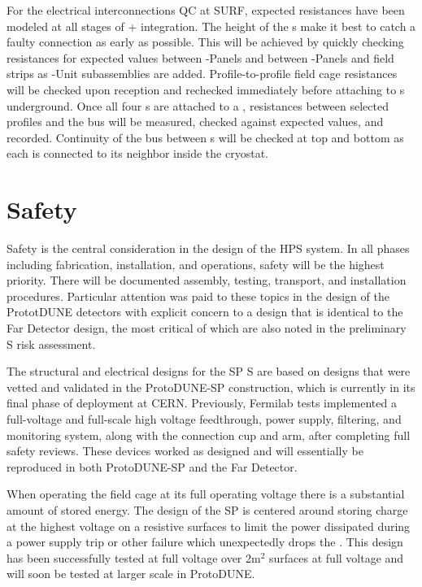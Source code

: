 For the electrical interconnections QC at SURF, expected resistances have been modeled at all stages of
+ integration.  The height of the s make it best to catch a
faulty connection as early as possible.  This will be achieved by
quickly checking resistances for expected values between -Panels and between -Panels and field strips as -Unit subassemblies are added.  Profile-to-profile field cage resistances
will be checked upon reception and rechecked immediately before
attaching to s underground.  Once all four s are attached to a
, resistances between selected  profiles and the  bus will be
measured, checked against expected values, and recorded. Continuity of
the  bus between s will be checked at top and bottom as each 
is connected to its neighbor inside the cryostat.


\section{Safety}
\label{sec:fdsp-hv-safety}

Safety is the central consideration in the design of the HPS system. In all phases including fabrication, installation, and operations, safety will be the highest priority. There will be documented assembly, testing, transport, and installation procedures. Particular attention was paid to these topics in the design of the PrototDUNE detectors with explicit concern to a design that is identical to the Far Detector design, the most critical of which are also noted in the preliminary S risk assessment. 

The structural and electrical designs for the SP S are based on designs that were vetted and validated in the ProtoDUNE-SP construction, which is currently in its final phase of deployment at CERN. Previously, Fermilab  tests implemented a full-voltage and full-scale high voltage feedthrough, power supply, filtering, and monitoring system, along with the  connection cup and arm, after completing full safety reviews. These devices worked as designed and will essentially be reproduced in both ProtoDUNE-SP and the Far Detector. 

When operating the field cage at its full operating voltage there is a substantial amount of stored energy. The design of the SP  is centered around storing charge  at the highest voltage on a resistive surfaces to limit the power dissipated during a power supply trip or other failure which unexpectedly drops the . This design has been successfully tested at full voltage over 2m$^2$ surfaces at full voltage and will soon be tested at larger scale in ProtoDUNE.  

